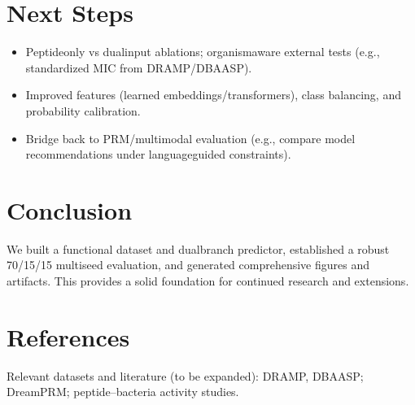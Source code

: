 \documentclass{article}
\begin{document}
\section{Next Steps}
\begin{itemize}[leftmargin=*,nosep]
  \item Peptide\-only vs dual\-input ablations; organism\-aware external tests (e.g., standardized MIC from DRAMP/DBAASP).
  \item Improved features (learned embeddings/transformers), class balancing, and probability calibration.
  \item Bridge back to PRM/multimodal evaluation (e.g., compare model recommendations under language\-guided constraints).
\end{itemize}

\section{Conclusion}
We built a functional dataset and dual\-branch predictor, established a robust 70/15/15 multi\-seed evaluation, and generated comprehensive figures and artifacts. This provides a solid foundation for continued research and extensions.

\section*{References}
Relevant datasets and literature (to be expanded): DRAMP, DBAASP; DreamPRM; peptide--bacteria activity studies.
\end{document}
